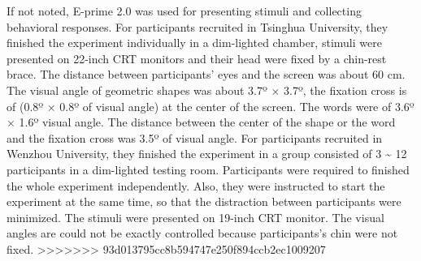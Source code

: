 \documentclass[
  man]{apa6}
\begin{document}
If not noted, E-prime 2.0 was used for presenting stimuli and collecting behavioral responses. For participants recruited in Tsinghua University, they finished the experiment individually in a dim-lighted chamber, stimuli were presented on 22-inch CRT monitors and their head were fixed by a chin-rest brace. The distance between participants' eyes and the screen was about 60 cm. The visual angle of geometric shapes was about 3.7º × 3.7º, the fixation cross is of (0.8º × 0.8º of visual angle) at the center of the screen. The words were of 3.6º × 1.6º visual angle. The distance between the center of the shape or the word and the fixation cross was 3.5º of visual angle. For participants recruited in Wenzhou University, they finished the experiment in a group consisted of 3 \textasciitilde{} 12 participants in a dim-lighted testing room. Participants were required to finished the whole experiment independently. Also, they were instructed to start the experiment at the same time, so that the distraction between participants were minimized. The stimuli were presented on 19-inch CRT monitor. The visual angles are could not be exactly controlled because participants's chin were not fixed.
>>>>>>> 93d013795cc8b594747e250f894ccb2ec1009207
\end{document}
